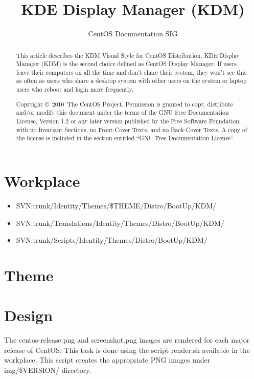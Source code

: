 \documentclass{article}
\title{KDE Display Manager (KDM)}
\author{CentOS Documentation SIG}
\begin{document}
\maketitle

\begin{abstract} 
This article describes the KDM Visual Style for CentOS Distribution.
KDE Display Manager (KDM) is the second choice defined as CentOS
Display Manager. If users leave their computers on all the time and
don't share their system, they won't see this as often as users who
share a desktop system with other users on the system or laptop users
who reboot and login more frequently.

Copyright \copyright\ 2010\ The CentOS Project. Permission is
granted to copy, distribute and/or modify this document under the
terms of the GNU Free Documentation License, Version 1.2 or any later
version published by the Free Software Foundation; with no Invariant
Sections, no Front-Cover Texts, and no Back-Cover Texts. A copy of the
license is included in the section entitled ``GNU Free Documentation
License''.  
\end{abstract}

\tableofcontents

\section{Workplace}

\begin{itemize}
\item SVN:trunk/Identity/Themes/\$THEME/Distro/BootUp/KDM/
\item SVN:trunk/Translations/Identity/Themes/Distro/BootUp/KDM/
\item SVN:trunk/Scripts/Identity/Themes/Distro/BootUp/KDM/
\end{itemize}

\section{Theme}



\section{Design}

The centos-release.png and screenshot.png images are rendered for each
major release of CentOS. This task is done using the script render.sh
available in the workplace.  This script creates the appropriate PNG
images under img/\$VERSION/ directory.
\end{document}
